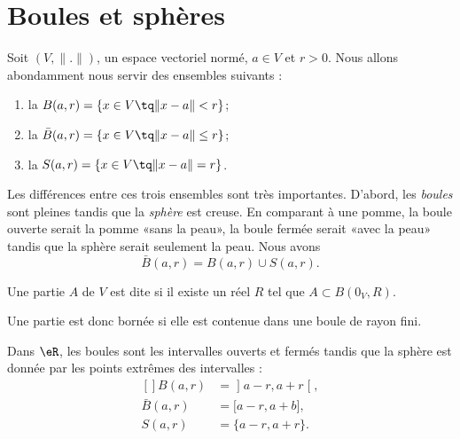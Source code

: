 \section{Boules et sphères}\label{Sect_boules}

\begin{definition}
	Soit $(V,\| . \|)$, un espace vectoriel normé, $a\in V$ et $r>0$. Nous allons abondamment nous servir des ensembles suivants :
	\begin{enumerate}

		\item
			la  $B(a,r)=\{ x\in V\tq \| x-a \|<r \}$;
		\item
			la  $\bar B(a,r)=\{ x\in V\tq \| x-a \|\leq r \}$;
		\item
			la  $S(a,r)=\{ x\in V\tq \| x-a \|=r \}$.

	\end{enumerate}
\end{definition}
Les différences entre ces trois ensembles sont très importantes. D'abord, les \emph{boules} sont pleines tandis que la \emph{sphère} est creuse. En comparant à une pomme, la boule ouverte serait la pomme «sans la peau», la boule fermée serait «avec la peau» tandis que la sphère serait seulement la peau. Nous avons
\begin{equation}
	\bar B(a,r)=B(a,r)\cup S(a,r).
\end{equation}

\begin{definition}
	Une partie $A$ de $V$ est dite  si il existe un réel $R$ tel que $A\subset B(0_V,R)$.
\end{definition}
Une partie est donc bornée si elle est contenue dans une boule de rayon fini.

\begin{example}
	Dans $\eR$, les boules sont  les intervalles ouverts et fermés tandis que la sphère est donnée par les points extrêmes des intervalles :
	\begin{equation}
		\begin{aligned}[]
			B(a,r)&=\mathopen] a-r , a+r \mathclose[,\\
			\bar B(a,r)&=\mathopen[ a-r , a+b \mathclose],\\
			S(a,r)&=\{ a-r,a+r \}.
		\end{aligned}
	\end{equation}
\end{example}

